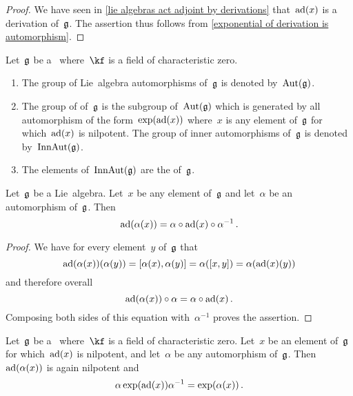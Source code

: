 \begin{proof}
  We have seen in \cref{lie algebras act adjoint by derivations} that~$\operatorname{ad}(x)$ is a derivation of~$\mathfrak{g}$.
  The assertion thus follows from \cref{exponential of derivation is automorphism}.
\end{proof}


\begin{definition}
  Let~$\mathfrak{g}$ be a~\liealgebra{$\kf$} where~$\kf$ is a field of characteristic zero.
  \begin{enumerate}
    \item
      The group of Lie~algebra automorphisms of~$\mathfrak{g}$ is denoted by~$\operatorname{Aut}(\mathfrak{g})$.
    \item
      The group of  of~$\mathfrak{g}$ is the subgroup of~$\operatorname{Aut}(\mathfrak{g})$ which is generated by all automorphism of the form~$\exp(\operatorname{ad}(x))$ where~$x$ is any element of~$\mathfrak{g}$ for which~$\operatorname{ad}(x)$ is nilpotent.
      The group of inner automorphisms of~$\mathfrak{g}$ is denoted by~$\operatorname{InnAut}(\mathfrak{g})$.
    \item
      The elements of~$\operatorname{InnAut}(\mathfrak{g})$ are the  of~$\mathfrak{g}$.
  \end{enumerate}
\end{definition}


\begin{lemma}
  \label{adjoint and automorphisms}
  Let~$\mathfrak{g}$ be a Lie~algebra.
  Let~$x$ be any element of~$\mathfrak{g}$ and let~$\alpha$ be an automorphism of~$\mathfrak{g}$.
  Then
  \[
    \operatorname{ad}(\alpha(x))
    =
    \alpha \circ \operatorname{ad}(x) \circ \alpha^{-1} \,.
  \]
\end{lemma}


\begin{proof}
  We have for every element~$y$ of~$\mathfrak{g}$ that
  \[
    \operatorname{ad}(\alpha(x))(\alpha(y))
    =
    [\alpha(x), \alpha(y)]
    =
    \alpha( [x,y] )
    =
    \alpha( \operatorname{ad}(x)(y) )
  \]
  and therefore overall
  \[
    \operatorname{ad}(\alpha(x)) \circ \alpha
    =
    \alpha \circ \operatorname{ad}(x) \,.
  \]
  Composing both sides of this equation with~$\alpha^{-1}$ proves the assertion.
\end{proof}


\begin{lemma}
  \label{conjugation of inner automorphism}
  Let~$\mathfrak{g}$ be a~\liealgebra{$\kf$} where~$\kf$ is a field of characteristic zero.
  Let~$x$ be an element of~$\mathfrak{g}$ for which~$\operatorname{ad}(x)$ is nilpotent, and let~$\alpha$ be any automorphism of~$\mathfrak{g}$.
  Then~$\operatorname{ad}(\alpha(x))$ is again nilpotent and
  \[
    \alpha \exp(\operatorname{ad}(x)) \alpha^{-1}
    =
    \exp( \alpha(x) ) \,.
  \]
\end{lemma}


